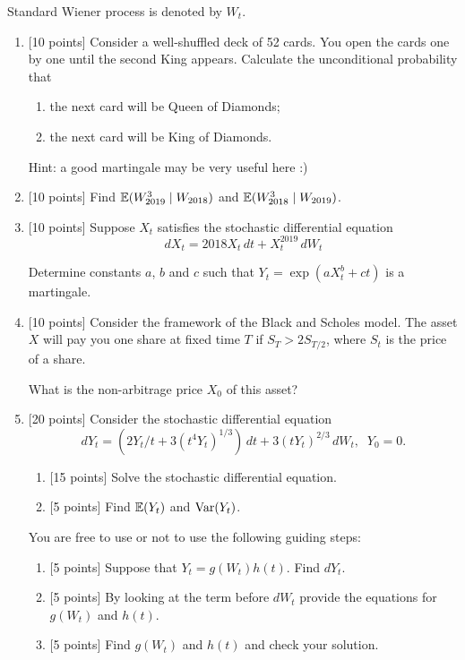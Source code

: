 \documentclass[12pt, a4paper]{article}
\begin{document}
Standard Wiener process is denoted by $W_t$.

\begin{enumerate}[resume]
  \item {[10 points]} Consider a well-shuffled deck of 52 cards. You open the cards one by one until the second King appears. Calculate the unconditional probability that
  \begin{enumerate}
    \item the next card will be Queen of Diamonds;
    \item the next card will be King of Diamonds.
  \end{enumerate}

  Hint: a good martingale may be very useful here :)

  \item {[10 points]} Find $\operatorname{\mathbb{E}}(W_{2019}^3 \mid W_{2018})$ and $\operatorname{\mathbb{E}}(W_{2018}^3 \mid W_{2019})$.


  \item {[10 points]} Suppose $X_t$ satisfies the stochastic differential equation
  \[
    dX_t = 2018 X_t \, dt + X_t^{2019} \, dW_t
  \]

  Determine constants $a$, $b$ and $c$ such that $Y_t = \exp(aX_t^b + ct)$ is a martingale.

  \item {[10 points]} Consider the framework of the Black and Scholes model.
The asset $X$ will pay you one share at fixed time $T$ if $S_T > 2S_{T/2}$,
where $S_t$ is the price of a share.

What is the non-arbitrage price $X_0$ of this asset?
  \item {[20 points]} Consider the stochastic differential equation
  \[
  dY_t =(2Y_t/t + 3(t^4Y_t)^{1/3}) \, dt + 3(tY_t)^{2/3} \, dW_t, \;\; Y_0=0.
  \]

  \begin{enumerate}
    \item {[15 points]} Solve the stochastic differential equation.
    \item {[5 points]} Find $\operatorname{\mathbb{E}}(Y_t)$ and $\operatorname{Var}(Y_t)$.
  \end{enumerate}

  You are free to use or not to use the following guiding steps:

  \begin{enumerate}[resume]
    \item {[5 points]} Suppose that $Y_t=g(W_t)h(t)$. Find $dY_t$.
    \item {[5 points]} By looking at the term before $dW_t$ provide the equations for $g(W_t)$ and $h(t)$.
    \item {[5 points]} Find $g(W_t)$ and $h(t)$ and check your solution.
  \end{enumerate}

\end{enumerate}
\end{document}
